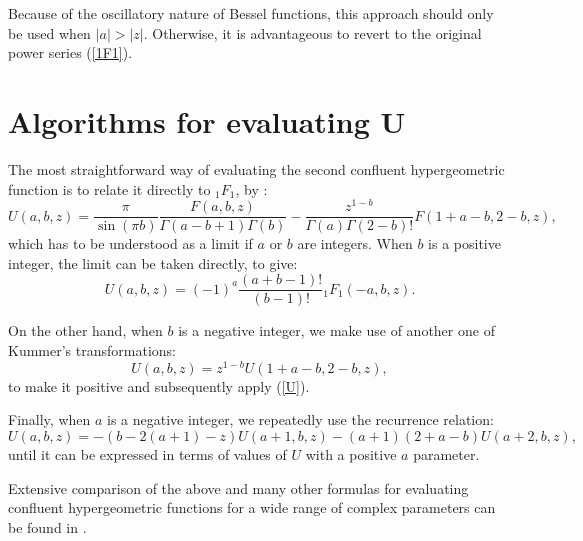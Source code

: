 		Because of the oscillatory nature of Bessel functions, this approach should only be used when $|a|>|z|$. Otherwise, it is advantageous to revert to the original power series (\ref{1F1}).
		
		\section{Algorithms for evaluating U}
	
	The most straightforward way of evaluating the second confluent hypergeometric function is to relate it directly to {$_1F_1$}, by \cite{AS}:
		\begin{equation} \label{U}
		U(a,b,z) = \frac{\pi}{\sin(\pi b)}\frac{F(a,b,z)}{\Gamma(a-b+1)\Gamma(b)}-\frac{z^{1-b}}{\Gamma(a)\Gamma(2-b)!}F(1+a-b,2-b,z) ,
		\end{equation}
	which has to be understood as a limit if $a$ or $b$ are integers. When $b$ is a positive integer, the limit can be taken directly, to give:
	\begin{equation}
	U(a,b,z) = (-1)^a \frac{(a+b-1)!}{(b-1)!}{_1F_1(-a,b,z)} .
	\end{equation}
	
		On the other hand, when $b$ is a negative integer, we make use of another one of Kummer's transformations:
			\begin{equation}
			U(a,b,z) = z^{1-b}U(1+a-b,2-b,z) ,
			\end{equation}
		to make it positive and subsequently apply (\ref{U}).
		
	Finally, when $a$ is a negative integer, we repeatedly use the recurrence relation:
				\begin{equation}
				U(a,b,z) = -(b-2(a+1)-z)U(a+1,b,z)-(a+1)(2+a-b)U(a+2,b,z) ,
				\end{equation}
				until it can be expressed in terms of values of $U$ with a positive $a$ parameter.
						
			Extensive comparison of the above and many other formulas for evaluating confluent hypergeometric functions for a wide range of complex parameters can be found in \cite{Pearson2017}.
